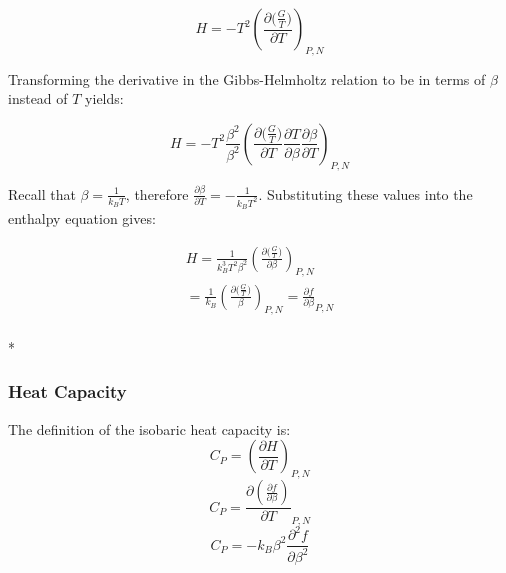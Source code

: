\documentclass[9pt,bestpractices]{livecoms}
\begin{document}
\begin{equation}H=-T^2 \left(\frac{\partial \big(\frac{G}{T}\big)}{\partial T}\right)_{P,N}\end{equation}

Transforming the derivative in the Gibbs-Helmholtz relation to be in terms of $\beta$ instead of $T$ yields:

\begin{equation}H=-T^2  \frac{\beta^2}{\beta^2}\left(\frac{\partial \big(\frac{G}{T}\big)}{\partial T} \frac{\partial T}{\partial \beta} \frac{\partial \beta}{\partial T}\right)_{P,N}\end{equation}


Recall that $\beta = \frac{1}{k_B T}$, therefore $\frac{\partial \beta}{\partial T} = - \frac{1}{k_B T^2}$. Substituting these values into the enthalpy equation gives:

\begin{multline}
H = \frac{1}{k_B^3 T^2 \beta^2} \left(\frac{\partial \big(\frac{G}{T}\big)}{\partial \beta}\right)_{P,N} \\ = \frac{1}{k_B} \left(\frac{\partial \big(\frac{G}{T}\big)}{\beta}\right)_{P,N} = \frac{\partial f}{\partial \beta}_{P,N} 
\end{multline}\\*



\subsubsection{Heat Capacity}
The definition of the isobaric heat capacity is:
\begin{equation}C_P = \left( \frac{\partial H}{\partial T}\right)_{P,N}\end{equation}
\begin{equation}C_P =  \frac{\partial \left(\frac{\partial f}{\partial \beta}\right)}{\partial T}_{P,N}\end{equation}
\begin{equation}C_P = -k_B \beta^2 \frac{\partial^2 f}{\partial \beta^2}\end{equation}
\end{document}
